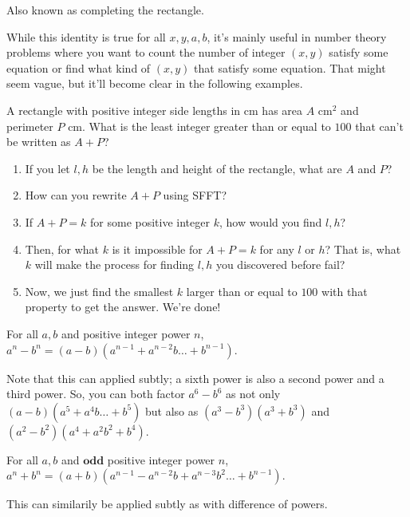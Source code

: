 \documentclass[mast]{lucky}
\begin{document}
Also known as completing the rectangle.

While this identity is true for all $x,y,a,b$, it's mainly useful in number theory problems where you want to count the number of integer $(x,y)$ satisfy some equation or find what kind of $(x,y)$ that satisfy some equation. That might seem vague, but it'll become clear in the following examples. 

\begin{exam}
A rectangle with positive integer side lengths in $\text{cm}$ has area $A$ $\text{cm}^2$ and perimeter $P$ $\text{cm}$. What is the least integer greater than or equal to $100$ that can't be written as $A+P$?
\end{exam}
\begin{walk}
\begin{enumerate}
    \item If you let $l,h$ be the length and height of the rectangle, what are $A$ and $P$?
    \item How can you rewrite $A+P$ using SFFT?
    \item If $A+P=k$ for some positive integer $k$, how would you find $l,h$? 
    \item Then, for what $k$ is it impossible for $A+P=k$ for any $l$ or $h$? That is, what $k$ will make the process for finding $l,h$ you discovered before fail?
    \item Now, we just find the smallest $k$ larger than or equal to $100$ with that property to get the answer. We're done!
\end{enumerate}
\end{walk}

\begin{theo}
For all $a,b$ and positive integer power $n$, $a^{n}-b^{n}=(a-b)(a^{n-1}+a^{n-2}b\ldots + b^{n-1})$.
\end{theo}
Note that this can applied subtly; a sixth power is also a second power and a third power. So, you can both factor $a^6-b^6$ as not only $(a-b)(a^5+a^4b\ldots + b^5)$ but also as $(a^3-b^3)(a^3+b^3)$ and $(a^2-b^2)(a^4+a^2b^2+b^4)$.

\begin{theo}
For all $a,b$ and $\textbf{odd}$ positive integer power $n$, $a^n+b^n=(a+b)(a^{n-1}-a^{n-2}b+a^{n-3}b^2\ldots +b^{n-1})$.
\end{theo}

This can similarily be applied subtly as with difference of powers.
\end{document}
